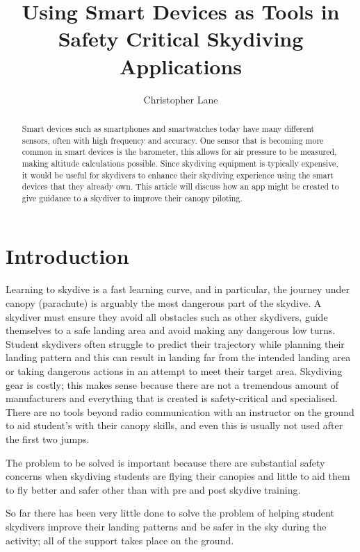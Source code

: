\documentclass[11pt, a4paper, twocolumn]{article}
\title{Using Smart Devices as Tools in Safety Critical Skydiving Applications}
\author{Christopher Lane}
\begin{document}
\maketitle

\begin{abstract} %
    Smart devices such as smartphones and smartwatches today have many different sensors, often with high frequency and accuracy. One sensor that is becoming more common in smart devices is the barometer, this allows for air pressure to be measured, making altitude calculations possible. Since skydiving equipment is typically expensive, it would be useful for skydivers to enhance their skydiving experience using the smart devices that they already own. This article will discuss how an app might be created to give guidance to a skydiver to improve their canopy piloting.
\end{abstract}

\section{Introduction}\label{sec:introduction} %

Learning to skydive is a fast learning curve, and in particular, the journey under canopy (parachute) is arguably the most dangerous part of the skydive. A skydiver must ensure they avoid all obstacles such as other skydivers, guide themselves to a safe landing area and avoid making any dangerous low turns. Student skydivers often struggle to predict their trajectory while planning their landing pattern and this can result in landing far from the intended landing area or taking dangerous actions in an attempt to meet their target area.
Skydiving gear is costly; this makes sense because there are not a tremendous amount of manufacturers and everything that is created is safety-critical and specialised. There are no tools beyond radio communication with an instructor on the ground to aid student's with their canopy skills, and even this is usually not used after the first two jumps.

The problem to be solved is important because there are substantial safety concerns when skydiving students are flying their canopies and little to aid them to fly better and safer other than with pre and post skydive training.

So far there has been very little done to solve the problem of helping student skydivers improve their landing patterns and be safer in the sky during the activity; all of the support takes place on the ground.
\end{document}
